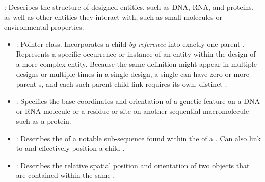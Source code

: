 \begin{description}


\item \emph{}: Describes the structure of designed entities, such as DNA, RNA, and proteins, as well as other entities they interact with, such as small molecules or environmental properties.

\begin{itemize}
\item \emph{}:
Pointer class. Incorporates a child  \textit{by reference} into exactly one parent . Represents a specific occurrence or instance of an entity within the design of a more complex entity. Because the same definition might appear in  multiple designs or multiple times in a single design, a single  can have zero or more parent s, and each such parent-child link requires its own, distinct .

\item \emph{}:
Specifies the base coordinates and orientation of a genetic feature on a DNA or RNA molecule or a residue or site on another sequential macromolecule such as a protein.

\item \emph{}:
Describes the  of a notable sub-sequence found within the  of a . Can also link to and effectively position a child .

\item \emph{}:
Describes the relative spatial position and orientation of two  objects that are contained within the same .
\end{itemize}




\end{description}
